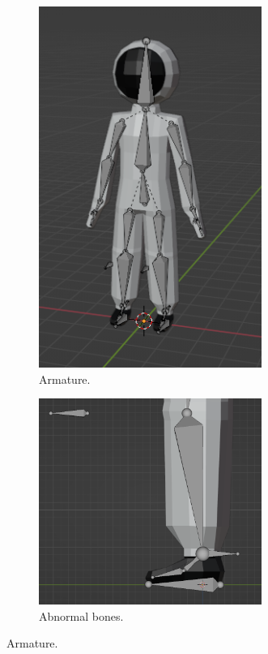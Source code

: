\begin{figure}[H]
    \centering
    \begin{subfigure}{0.45\textwidth}
        \centering
        \includegraphics[width=0.8\textwidth]{chapters/theoretical_foundations/sections/models/resources/Armature.png}
        \caption{Armature.}
        \label{fig:armature}
    \end{subfigure}
    \hfill
    \begin{subfigure}{0.45\textwidth}
        \centering
        \includegraphics[width=0.8\textwidth]{chapters/theoretical_foundations/sections/models/resources/ArmatureFoot.png}
        \caption{Abnormal bones.}
        \label{fig:armature_foot}
    \end{subfigure}

    \caption{Armature.}
\end{figure}

